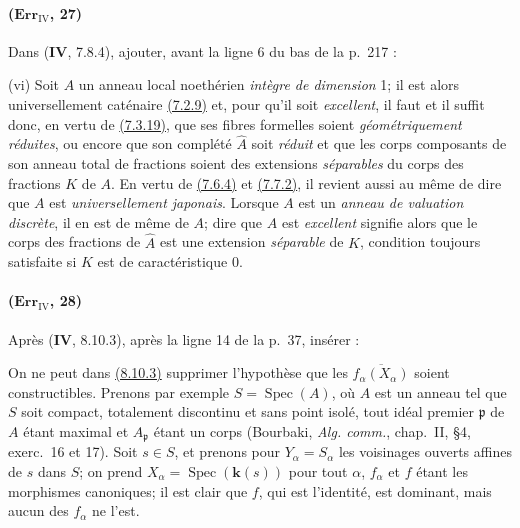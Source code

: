 \paragraph{($\mathbf{Err}_{\mathrm{IV}}$, 27)}
Dans (\textbf{IV}, 7.8.4), ajouter, avant la ligne 6 du bas de la p.~217 :

\smallskip
\noindent
\textup{(vi)} Soit $A$ un anneau local noethérien \emph{intègre de dimension}
1; il est alors universellement caténaire
{\hyperref[canon-index.ega4.c04.cor.7-2-9]{(7.2.9)}} et, pour qu'il soit \emph{excellent},
il faut et il suffit donc, en vertu de
{\hyperref[canon-index.ega4.c04.statement.7-3-19]{(7.3.19)}}, que ses fibres
formelles soient \emph{géométriquement réduites}, ou encore que son complété
$\widehat A$ soit \emph{réduit} et que les corps composants de son anneau total
de fractions soient des extensions \emph{séparables} du corps des fractions
$K$ de $A$. En vertu de {\hyperref[canon-index.ega4.c04.thm.7-6-4]{(7.6.4)}} et
{\hyperref[canon-index.ega4.c04.thm.7-7-2]{(7.7.2)}}, il revient aussi au même de
dire que $A$ est \emph{universellement japonais}. Lorsque $A$ est un \emph{anneau de
valuation discrète}, il en est de même de $A$; dire que $A$ est
\emph{excellent} signifie alors que le corps des fractions de $\widehat A$
est une extension \emph{séparable} de $K$, condition toujours satisfaite si
$K$ est de caractéristique 0.

\paragraph{($\mathbf{Err}_{\mathrm{IV}}$, 28)}
Après (\textbf{IV}, 8.10.3), après la ligne 14 de la p.~37, insérer :

\begin{remark}[8.10.3.1]
\label{IV.8.10.3.1}
On ne peut dans {\hyperref[canon-index.ega4.c04.prop.8-10-3]{(8.10.3)}} supprimer
l'hypothèse que les $\overline{f_\alpha(X_\alpha)}$ soient
constructibles. Prenons par exemple $S=\operatorname{Spec}(A)$, où $A$
est un anneau tel que $S$ soit compact, totalement discontinu et sans
point isolé, tout idéal premier $\mathfrak p$ de $A$ étant maximal et
$A_\mathfrak p$ étant un corps (Bourbaki, \emph{Alg. comm.}, chap.~II,
\S4, exerc.~16 et 17). Soit $s\in S$, et prenons pour
$Y_\alpha=S_\alpha$ les voisinages ouverts affines de $s$ dans $S$; on
prend $X_\alpha=\operatorname{Spec}(\boldsymbol{k}(s))$ pour tout $\alpha$,
$f_\alpha$ et $f$ étant les morphismes canoniques; il est clair que
$f$, qui est l'identité, est dominant, mais aucun des $f_\alpha$ ne
l'est.
\end{remark}

